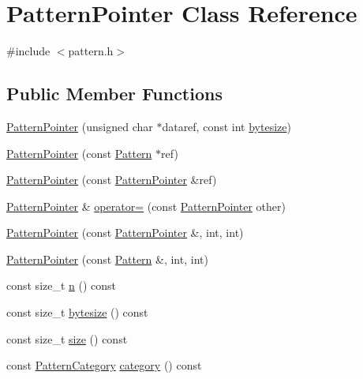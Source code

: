 \hypertarget{classPatternPointer}{}\section{Pattern\+Pointer Class Reference}
\label{classPatternPointer}


{\ttfamily \#include $<$pattern.\+h$>$}

\subsection*{Public Member Functions}
\begin{DoxyCompactItemize}
\item 
\hyperlink{classPatternPointer_ae636664cd90e3529db1006c8fa85fe36}{Pattern\+Pointer} (unsigned char $\ast$dataref, const int \hyperlink{classPatternPointer_a8a204b408ed1cccc3b0c89183e818210}{bytesize})
\item 
\hyperlink{classPatternPointer_a5eb9e3fcab5a8551cdce0283fe944ea8}{Pattern\+Pointer} (const \hyperlink{classPattern}{Pattern} $\ast$ref)
\item 
\hyperlink{classPatternPointer_a39eb71907e688b7b459b56806d8053e4}{Pattern\+Pointer} (const \hyperlink{classPatternPointer}{Pattern\+Pointer} \&ref)
\item 
\hyperlink{classPatternPointer}{Pattern\+Pointer} \& \hyperlink{classPatternPointer_aa9db1bf0980f3ce147638c24e045ead8}{operator=} (const \hyperlink{classPatternPointer}{Pattern\+Pointer} other)
\item 
\hyperlink{classPatternPointer_aa13d9661c3e49d0846ea1e10d2917ab8}{Pattern\+Pointer} (const \hyperlink{classPatternPointer}{Pattern\+Pointer} \&, int, int)
\item 
\hyperlink{classPatternPointer_a0eba7796fceeba5d3a19308dfc0a783b}{Pattern\+Pointer} (const \hyperlink{classPattern}{Pattern} \&, int, int)
\item 
const size\+\_\+t \hyperlink{classPatternPointer_a557d9f27ecad057a8942770313c22e42}{n} () const 
\item 
const size\+\_\+t \hyperlink{classPatternPointer_a8a204b408ed1cccc3b0c89183e818210}{bytesize} () const 
\item 
const size\+\_\+t \hyperlink{classPatternPointer_a2c8bab975c7234c935f7992701b897b9}{size} () const 
\item 
const \hyperlink{pattern_8h_a17879f85ec892834fb691c61e71dfe54}{Pattern\+Category} \hyperlink{classPatternPointer_aab5856a3a8e1ae58c7446b631142503e}{category} () const 

\end{DoxyCompactItemize}
